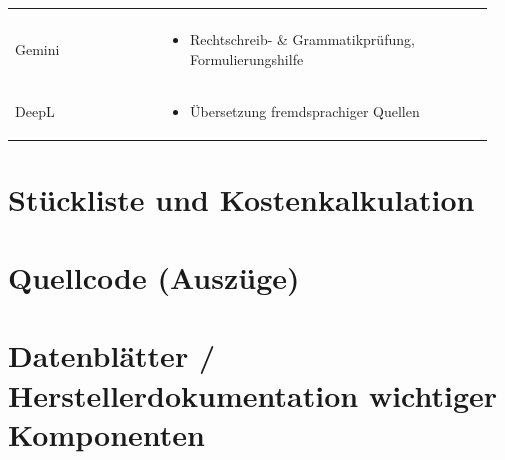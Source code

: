 \begin{table}[hbt]
\begin{tabular}{>{\raggedright\arraybackslash}p{0.3\linewidth} >{\raggedright\arraybackslash}p{0.65\linewidth}}
\begin{itemize}[noitemsep,topsep=0pt,partopsep=0pt,parsep=0pt]
		\end{itemize} \\
		Gemini &
		\vspace{-\topsep}
		\begin{itemize}[noitemsep,topsep=0pt,partopsep=0pt,parsep=0pt]
			\item Rechtschreib- \& Grammatikprüfung, Formulierungshilfe
		\end{itemize} \\
		DeepL &
		\vspace{-\topsep}
		\begin{itemize}[noitemsep,topsep=0pt,partopsep=0pt,parsep=0pt]
			\item Übersetzung fremdsprachiger Quellen
		\end{itemize} \\
		\hline
		
	\end{tabular} 
\end{table}


\chapter{Stückliste und Kostenkalkulation}



\chapter{Quellcode (Auszüge)}


\chapter{Datenblätter / Herstellerdokumentation wichtiger Komponenten}





